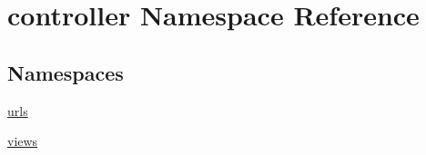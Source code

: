 \hypertarget{namespacecontroller}{}\section{controller Namespace Reference}
\label{namespacecontroller}
\subsection*{Namespaces}
\begin{DoxyCompactItemize}
\item 
 \hyperlink{namespacecontroller_1_1urls}{urls}
\item 
 \hyperlink{namespacecontroller_1_1views}{views}
\end{DoxyCompactItemize}
